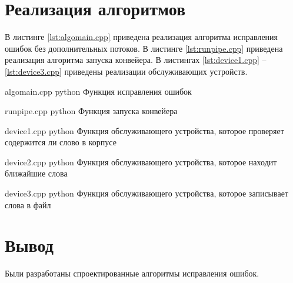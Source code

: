 \section{Реализация алгоритмов}

В листинге \ref{lst:algomain.cpp} приведена реализация алгоритма исправления ошибок без дополнительных потоков. 
В листинге \ref{lst:runpipe.cpp} приведена реализация алгоритма запуска конвейера.
В листингах \ref{lst:device1.cpp} -- \ref{lst:device3.cpp} приведены реализации обслуживающих устройств.

\clearpage
{}
{algomain.cpp} %
{python} %
{Функция исправления ошибок} %

\clearpage

{runpipe.cpp} %
{python} %
{Функция запуска конвейера} %

\clearpage

{device1.cpp} %
{python} %
{Функция обслуживающего устройства, которое проверяет содержится ли слово в корпусе} %

\clearpage

{device2.cpp} %
{python} %
{Функция обслуживающего устройства, которое находит ближайшие слова} %

\clearpage


{device3.cpp} %
{python} %
{Функция обслуживающего устройства, которое записывает слова в файл} %




\section*{Вывод}
Были разработаны спроектированные алгоритмы исправления ошибок.

